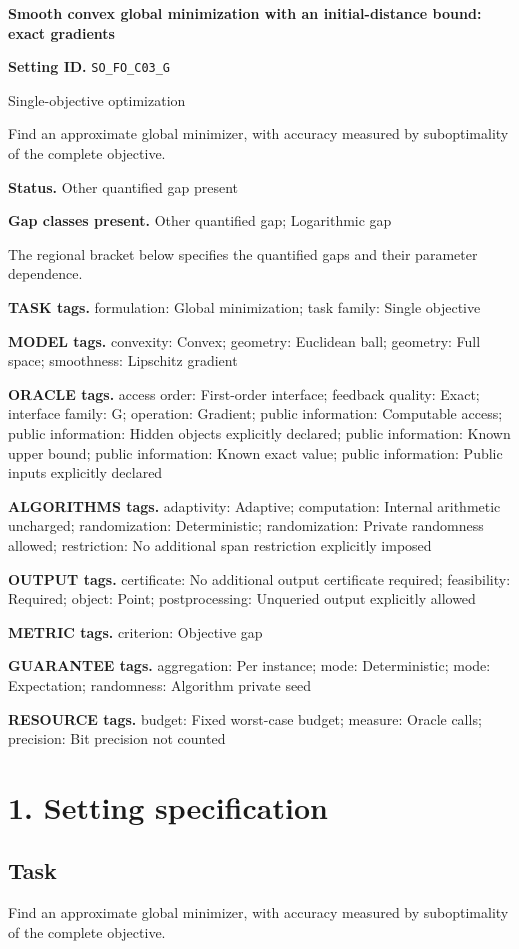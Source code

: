 \documentclass[10pt,a4paper]{article}
\begin{document}
\raggedright

{\LARGE\bfseries\sffamily\color{AtlasNavy} Smooth convex global minimization with an initial-distance bound: exact gradients\par}\vspace{5pt}
\textbf{Setting ID.} \texttt{SO\_\allowbreak{}FO\_\allowbreak{}C03\_\allowbreak{}G}

Single-objective optimization

Find an approximate global minimizer, with accuracy measured by suboptimality of the complete objective.

\textbf{Status.} Other quantified gap present

\textbf{Gap classes present.} Other quantified gap; Logarithmic gap

The regional bracket below specifies the quantified gaps and their parameter dependence.

\textbf{TASK tags.} formulation: Global minimization; task family: Single objective

\textbf{MODEL tags.} convexity: Convex; geometry: Euclidean ball; geometry: Full space; smoothness: Lipschitz gradient

\textbf{ORACLE tags.} access order: First-order interface; feedback quality: Exact; interface family: G; operation: Gradient; public information: Computable access; public information: Hidden objects explicitly declared; public information: Known upper bound; public information: Known exact value; public information: Public inputs explicitly declared

\textbf{ALGORITHMS tags.} adaptivity: Adaptive; computation: Internal arithmetic uncharged; randomization: Deterministic; randomization: Private randomness allowed; restriction: No additional span restriction explicitly imposed

\textbf{OUTPUT tags.} certificate: No additional output certificate required; feasibility: Required; object: Point; postprocessing: Unqueried output explicitly allowed

\textbf{METRIC tags.} criterion: Objective gap

\textbf{GUARANTEE tags.} aggregation: Per instance; mode: Deterministic; mode: Expectation; randomness: Algorithm private seed

\textbf{RESOURCE tags.} budget: Fixed worst-case budget; measure: Oracle calls; precision: Bit precision not counted

\section{1. Setting specification}
\subsection{Task}
Find an approximate global minimizer, with accuracy measured by suboptimality of the complete objective.
\end{document}
